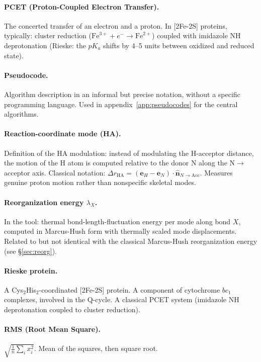 \documentclass[11pt,a4paper,twoside]{article}
\theoremstyle{remark}
\begin{document}
\paragraph{PCET (Proton-Coupled Electron Transfer).}
The concerted transfer of an electron and a proton. In [2Fe-2S]
proteins, typically: cluster reduction
($\text{Fe}^{3+} + e^- \to \text{Fe}^{2+}$) coupled with
imidazole NH deprotonation (Rieske: the $pK_a$ shifts by 4--5
units between oxidized and reduced state).

\paragraph{Pseudocode.}
Algorithm description in an informal but precise notation, without
a specific programming language. Used in
appendix~\ref{app:pseudocodes} for the central algorithms.

\paragraph{Reaction-coordinate mode (HA).}
Definition of the HA modulation: instead of modulating the
H-acceptor distance, the motion of the H atom is computed relative
to the donor N along the N$\to$acceptor axis. Classical notation:
$\Delta r_\text{HA} = (\mathbf{e}_H - \mathbf{e}_N)
\cdot \hat{\mathbf{n}}_{N\to\text{Acc}}$. Measures genuine proton
motion rather than nonspecific skeletal modes.

\paragraph{Reorganization energy $\lambda_X$.}
In the tool: thermal bond-length-fluctuation energy per mode along
bond $X$, computed in Marcus-Hush form with thermally scaled mode
displacements. Related to but not identical with the classical
Marcus-Hush reorganization energy (see \S\ref{sec:reorg}).

\paragraph{Rieske protein.}
A Cys$_2$His$_2$-coordinated [2Fe-2S] protein. A component of
cytochrome $bc_1$ complexes, involved in the Q-cycle. A classical
PCET system (imidazole NH deprotonation coupled to cluster
reduction).

\paragraph{RMS (Root Mean Square).}
$\sqrt{\frac{1}{n}\sum_i x_i^2}$. Mean of the squares, then square
root.
\end{document}
